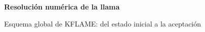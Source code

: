 \documentclass[11pt]{article}
\begin{document}
\centering
{\LARGE\bfseries Resolución numérica de la llama\par}
\vspace{3mm}
{\large Esquema global de KFLAME: del estado inicial a la aceptación\par}
\vspace{5mm}

\end{document}
